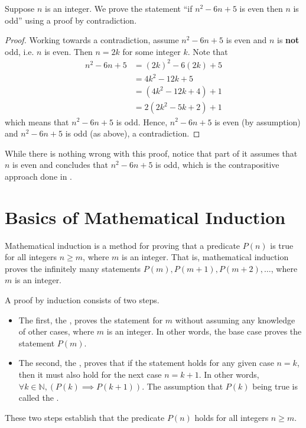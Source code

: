 \begin{example}
    \setlength{\parindent}{1.5em}

    Suppose $n$ is an integer. We prove the statement ``if $n^2 - 6n + 5$ is even then $n$ is odd'' using a proof by contradiction.
    \begin{proof}
        Working towards a contradiction, assume $n^2 - 6n + 5$ is even and $n$ is \textbf{not} odd, i.e. $n$ is even. Then $n = 2k$ for some integer $k$. Note that
        \begin{align*}
            n^2 - 6n + 5 &= (2k)^2 - 6(2k) + 5\\
            &= 4k^2 - 12k + 5\\
            &= (4k^2 - 12k + 4) + 1\\
            &= 2(2k^2 - 5k + 2) + 1
        \end{align*}
        which means that $n^2 - 6n + 5$ is odd. Hence, $n^2 - 6n + 5$ is even (by assumption) and $n^2 - 6n + 5$ is odd (as above), a contradiction.
    \end{proof}
    While there is nothing wrong with this proof, notice that part of it assumes that $n$ is even and concludes that  $n^2 - 6n + 5$ is odd, which is the contrapositive approach done in .
\end{example}

\section{Basics of Mathematical Induction}\label{section:basics-of-induction}
Mathematical induction is a method for proving that a predicate $P(n)$ is true for all integers $n \geq m$, where $m$ is an integer. That is, mathematical induction proves the infinitely many statements $P(m), P(m+1), P(m+2), \dots$, where $m$ is an integer.

A proof by induction consists of two steps.
\begin{itemize}
    \item The first, the , proves the statement for $m$ without assuming any knowledge of other cases, where $m$ is an integer. In other words, the base case proves the statement $P(m)$.
    \item The second, the , proves that if the statement holds for any given case $n = k$, then it must also hold for the next case $n = k + 1$. In other words, $\forall k \in \mathbb{N}, (P(k) \implies P(k+1))$. The assumption that $P(k)$ being true is called the .
\end{itemize}
These two steps establish that the predicate $P(n)$ holds for all integers $n \geq m$.


